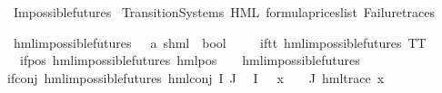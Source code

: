 %
\begin{isabellebody}%
%
%
\isadelimtheory
%
\endisadelimtheory
%
\isatagtheory
{}\isamarkupfalse%
\ Impossible{\isacharunderscore}{\kern0pt}futures\isanewline
{}\ Transition{\isacharunderscore}{\kern0pt}Systems\ HML\ formula{\isacharunderscore}{\kern0pt}prices{\isacharunderscore}{\kern0pt}list\ Failure{\isacharunderscore}{\kern0pt}traces\isanewline
{}%
\endisatagtheory
{\isafoldtheory}%
%
\isadelimtheory
%
\endisadelimtheory
%
\isadelimdocument
%
\endisadelimdocument
%
\isatagdocument
%
\isamarkuptrue%
%
\endisatagdocument
{\isafolddocument}%
%
\isadelimdocument
%
\endisadelimdocument
%
\begin{isamarkuptext}%
%
\end{isamarkuptext}\isamarkuptrue%
\isamarkupfalse%
\ hml{\isacharunderscore}{\kern0pt}impossible{\isacharunderscore}{\kern0pt}futures\ {\isacharcolon}{\kern0pt}{\isacharcolon}{\kern0pt}\ \ {\isachardoublequoteopen}{\isacharparenleft}{\kern0pt}{\isacharprime}{\kern0pt}a{\isacharcomma}{\kern0pt}\ {\isacharprime}{\kern0pt}s{\isacharparenright}{\kern0pt}hml\ {\isasymRightarrow}\ bool{\isachardoublequoteclose}\isanewline
\ \ \isanewline
\ \ if{\isacharunderscore}{\kern0pt}tt{\isacharcolon}{\kern0pt}\ {\isachardoublequoteopen}hml{\isacharunderscore}{\kern0pt}impossible{\isacharunderscore}{\kern0pt}futures\ TT{\isachardoublequoteclose}\ {\isacharbar}{\kern0pt}\isanewline
\ \ if{\isacharunderscore}{\kern0pt}pos{\isacharcolon}{\kern0pt}\ {\isachardoublequoteopen}hml{\isacharunderscore}{\kern0pt}impossible{\isacharunderscore}{\kern0pt}futures\ {\isacharparenleft}{\kern0pt}hml{\isacharunderscore}{\kern0pt}pos\ {\isasymalpha}\ {\isasymphi}{\isacharparenright}{\kern0pt}{\isachardoublequoteclose}\ \ {\isachardoublequoteopen}hml{\isacharunderscore}{\kern0pt}impossible{\isacharunderscore}{\kern0pt}futures\ {\isasymphi}{\isachardoublequoteclose}\ {\isacharbar}{\kern0pt}\isanewline
if{\isacharunderscore}{\kern0pt}conj{\isacharcolon}{\kern0pt}\ {\isachardoublequoteopen}hml{\isacharunderscore}{\kern0pt}impossible{\isacharunderscore}{\kern0pt}futures\ {\isacharparenleft}{\kern0pt}hml{\isacharunderscore}{\kern0pt}conj\ I\ J\ {\isasymPhi}{\isacharparenright}{\kern0pt}{\isachardoublequoteclose}\isanewline
{}\ {\isachardoublequoteopen}I\ {\isacharequal}{\kern0pt}\ {\isacharbraceleft}{\kern0pt}{\isacharbraceright}{\kern0pt}{\isachardoublequoteclose}\ {\isachardoublequoteopen}{\isasymforall}x\ {\isasymin}\ {\isacharparenleft}{\kern0pt}{\isasymPhi}\ {\isacharbackquote}{\kern0pt}\ J{\isacharparenright}{\kern0pt}{\isachardot}{\kern0pt}\ {\isacharparenleft}{\kern0pt}hml{\isacharunderscore}{\kern0pt}trace\ x{\isacharparenright}{\kern0pt}{\isachardoublequoteclose}\isanewline

\end{isabellebody}
